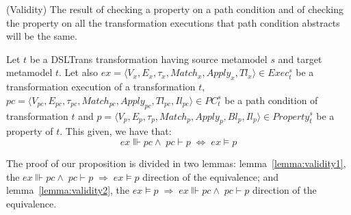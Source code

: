 \begin{proposition}{(Validity) The result of checking a property on a path condition and of checking the property on all the transformation executions that path condition abstracts will be the same.}
\label{prop:validity}

Let $t$ be a DSLTrans transformation having source metamodel $s$ and target
metamodel $t$. Let also $ex= \langle
V_x,E_x,\tau_x,Match_x,Apply_x,Tl_x\rangle\in Exec^{s}_{t}$ be a transformation
execution of a transformation $t$, $pc = \langle
V_{pc},E_{pc},\tau_{pc},Match_{pc},Apply_{pc},Tl_{pc},Il_{pc}\rangle \in
PC^{s}_{t}$ be a path condition of transformation $t$ and $p = \langle
V_{p},E_{p},\tau_{p},Match_{p},Apply_{p},Bl_{p},Il_{p}\rangle\in
Property^{s}_{t}$ be a property of $t$. This given, we have that:
$$ex\Vvdash pc \land\; pc\vdash p \;\Longleftrightarrow \; ex\models p$$
\end{proposition}

\begin{pf}
The proof of our proposition is divided in two lemmas: lemma~\ref{lemma:validity1}, the $ex\Vvdash pc
\land\; pc\vdash p \;\Longrightarrow \; ex\models p$ direction of the
equivalence; and lemma~\ref{lemma:validity2}, the $ex\models p \;\Longrightarrow\;ex\Vvdash pc\land\;
pc\vdash p$ direction of the equivalence.
\end{pf}


